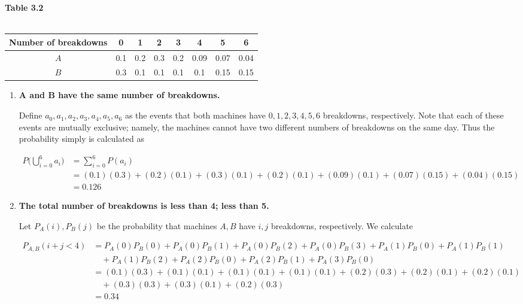 \documentclass[10pt, oneside]{article}
\begin{document}
\begin{enumerate}[label=3.\arabic*]
\begin{center}
\textbf{Table 3.2} \\
\textbf{ }\\
\renewcommand{\arraystretch}{3.5}
\begin{tabular}{c || c c c c c c c} 
 \hline
 Number of breakdowns & 0 & 1 & 2 & 3 & 4 & 5 & 6 \\
 \hline
$A$ & 0.1 & 0.2 & 0.3 & 0.2 & 0.09 & 0.07 & 0.04 \\
 \hline
$B$ & 0.3 & 0.1 & 0.1 & 0.1 & 0.1 & 0.15 & 0.15 \\
 \hline
\end{tabular}
\end{center}

	\begin{enumerate}
	\item  \begin{tcolorbox}[
	  colback=Cerulean!5!white,
	  colframe=Cerulean!75!black]
	\textbf{$\bm{A}$ and $\bm{B}$ have the same number of breakdowns.}
	\end{tcolorbox}
	
	Define $a_0, a_1, a_2, a_3, a_4, a_5, a_6$ as the events that both machines have $0, 1, 2, 3, 4, 5, 6$ breakdowns, respectively. Note that each of these events are mutually exclusive; namely, the machines cannot have two different numbers of breakdowns on the same day. Thus the probability simply is calculated as
	
	\begin{align*}
	P\Bigg( \bigcup^6_{i = 0} a_i \Bigg) &= \sum^6_{i = 0} P(a_i) \\
	&= (0.1)(0.3) + (0.2)(0.1) + (0.3)(0.1) + (0.2)(0.1) + (0.09)(0.1) + (0.07)(0.15) + (0.04)(0.15) \\
	&= \boxed{0.126}
	\end{align*}
	
	\item  \begin{tcolorbox}[
	  colback=Cerulean!5!white,
	  colframe=Cerulean!75!black]
	\textbf{The total number of breakdowns is less than 4; less than 5.}
	\end{tcolorbox}
	
	Let $P_A(i), P_B(j)$ be the probability that machines $A, B$ have $i, j$ breakdowns, respectively. We calculate
	
	\textbf{}
	
	\begin{align*}
	P_{A,B}(i + j < 4) &= P_A(0) P_B(0) + P_A(0) P_B(1) + P_A(0) P_B(2) + P_A(0) P_B(3) + P_A(1) P_B(0) + P_A(1) P_B(1) \\
	&\quad + P_A(1) P_B(2) + P_A(2) P_B(0) + P_A(2) P_B(1) + P_A(3) P_B(0) \\
	&= (0.1)(0.3) + (0.1)(0.1) + (0.1)(0.1) + (0.1)(0.1) + (0.2)(0.3) + (0.2)(0.1) + (0.2)(0.1) \\ 
	&\quad+ (0.3)(0.3) + (0.3)(0.1) + (0.2)(0.3) \\
	&= \boxed{0.34}
	\end{align*}
	

\end{enumerate}
\end{enumerate}
\end{document}
